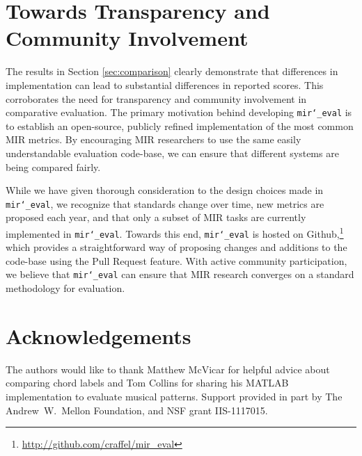 \documentclass{article}
\def\mireval{\texttt{mir\char`_eval}}
\begin{document}
\section{Towards Transparency and Community Involvement}
\label{sec:discussion}

The results in Section \ref{sec:comparison} clearly demonstrate that differences in implementation can lead to substantial differences in reported scores.
This corroborates the need for transparency and community involvement in comparative evaluation.
The primary motivation behind developing \mireval{} is to establish an open-source, publicly refined implementation of the most common MIR metrics.
By encouraging MIR researchers to use the same easily understandable evaluation code-base, we can ensure that different systems are being compared fairly.

While we have given thorough consideration to the design choices made in \mireval{}, we recognize that standards change over time, new metrics are proposed each year, and that only a subset of MIR tasks are currently implemented in \mireval{}.
Towards this end, \mireval{} is hosted on Github,\footnote{\url{http://github.com/craffel/mir_eval}} which provides a straightforward way of proposing changes and additions to the code-base using the Pull Request feature.
With active community participation, we believe that \mireval{} can ensure that MIR research converges on a standard methodology for evaluation.

\section{Acknowledgements}

The authors would like to thank Matthew McVicar for helpful advice about comparing chord labels and Tom Collins
for sharing his MATLAB implementation to evaluate musical patterns. Support provided in part by The Andrew~W.~Mellon Foundation, and NSF grant IIS-1117015.


\end{document}
